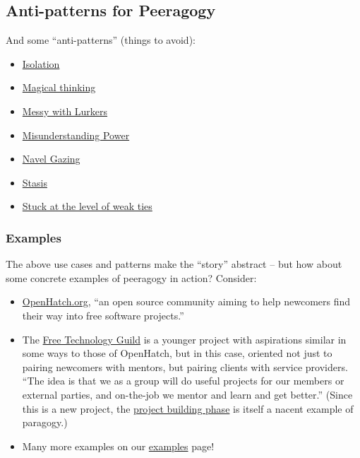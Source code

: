 \subsection{Anti-patterns for Peeragogy}

And some ``anti-patterns'' (things to avoid):

\begin{itemize}
\item
  \href{http://peeragogy.org/antipatterns/isolation/}{Isolation}
\item
  \href{http://peeragogy.org/antipatterns/magical-thinking/}{Magical
  thinking}
\item
  \href{http://peeragogy.org/antipatterns/co-learning-messy-with-lurkers/}{Messy
  with Lurkers}
\item
  \href{http://peeragogy.org/antipatterns/misunderstanding-power/}{Misunderstanding
  Power}
\item
  \href{http://peeragogy.org/antipatterns/navel-gazing/}{Navel Gazing}
\item
  \href{http://peeragogy.org/antipatterns/stasis/}{Stasis}
\item
  \href{http://peeragogy.org/antipatterns/stuck-at-the-level-of-weak-ties/}{Stuck
  at the level of weak ties}
\end{itemize}

\subsubsection{Examples}

The above use cases and patterns make the ``story'' abstract -- but how
about some concrete examples of peeragogy in action? Consider:

\begin{itemize}
\item
  \href{http://openhatch.org/}{OpenHatch.org}, ``an open source
  community aiming to help newcomers find their way into free software
  projects.''
\item
  The
  \href{http://campus.ftacademy.org/wiki/index.php/Free\_Technology\_Guild}{Free
  Technology Guild} is a younger project with aspirations similar in
  some ways to those of OpenHatch, but in this case, oriented not just
  to pairing newcomers with mentors, but pairing clients with service
  providers. ``The idea is that we as a group will do useful projects
  for our members or external parties, and on-the-job we mentor and
  learn and get better.'' (Since this is a new project, the
  \href{http://campus.ftacademy.org/community/pg/groups/8500/free-technology-guild-working-group/}{project
  building phase} is itself a nacent example of paragogy.)
\item
  Many more examples on our
  \href{http://peeragogy.org/examples/}{examples} page!
\end{itemize}

